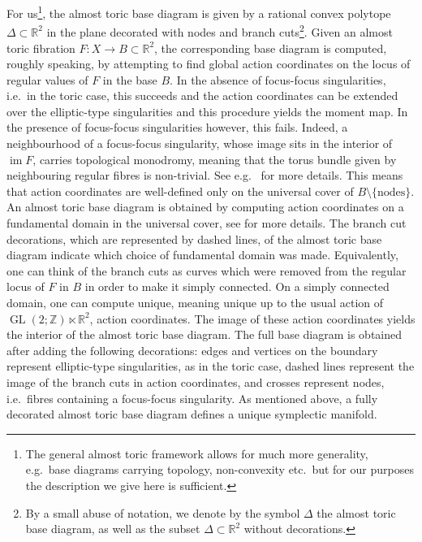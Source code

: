 \documentclass[12pt,a4paper,abstract=true,final]{scrartcl}
\DeclareMathOperator{\im}{im}
\begin{document}
For us\footnote{The general almost toric framework allows for much more generality, e.g.\ base diagrams carrying topology, non-convexity etc.\, but for our purposes the description we give here is sufficient.}, the almost toric base diagram is given by a rational convex polytope $\Delta \subset \mathbb{R}^2$ in the plane decorated with nodes and branch cuts\footnote{By a small abuse of notation, we denote by the symbol $\Delta$ the almost toric base diagram, as well as the subset $\Delta \subset \mathbb{R}^2$ without decorations.}.
Given an almost toric fibration $F \colon X \rightarrow B \subset \mathbb{R}^2$, the corresponding base diagram is computed, roughly speaking, by attempting to find global action coordinates on the locus of regular values of $F$ in the base $B$.
In the absence of focus-focus singularities, i.e.\ in the toric case, this succeeds and the action coordinates can be extended over the elliptic-type singularities and this procedure yields the moment map.
In the presence of focus-focus singularities however, this fails.
Indeed, a neighbourhood of a focus-focus singularity, whose image sits in the interior of $\im F$, carries topological monodromy, meaning that the torus bundle given by neighbouring regular fibres is non-trivial.
See e.g.\ \cite{Zun97} for more details.
This means that action coordinates are well-defined only on the universal cover of $B \setminus \{\text{nodes}\}$.
An almost toric base diagram is obtained by computing action coordinates on a fundamental domain in the universal cover, see \cite[Definition 8.3]{evans2021atfs} for more details.
The branch cut decorations, which are represented by dashed lines, of the almost toric base diagram indicate which choice of fundamental domain was made.
Equivalently, one can think of the branch cuts as curves which were removed from the regular locus of $F$ in $B$ in order to make it simply connected.
On a simply connected domain, one can compute unique, meaning unique up to the usual action of $\operatorname{GL}(2;\mathbb{Z}) \ltimes \mathbb{R}^2$, action coordinates.
The image of these action coordinates yields the interior of the almost toric base diagram.
The full base diagram is obtained after adding the following decorations: edges and vertices on the boundary represent elliptic-type singularities, as in the toric case, dashed lines represent the image of the branch cuts in action coordinates, and crosses represent nodes, i.e.\ fibres containing a focus-focus singularity.
As mentioned above, a fully decorated almost toric base diagram defines a unique symplectic manifold.
\end{document}
